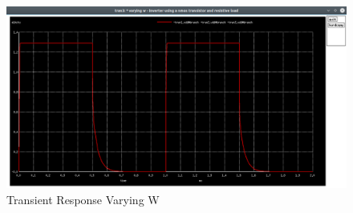 \documentclass[12pt, a4paper]{article}
\begin{document}
	\begin{figure}[H]
		\begin{center}
			\includegraphics[scale=0.25]{images/inverter_w_vdd.png}
			\caption{Transient Response Varying W}
			\label{fig::varying_w_vdd}
		\end{center}
	\end{figure}
	
	
	
\end{document}
